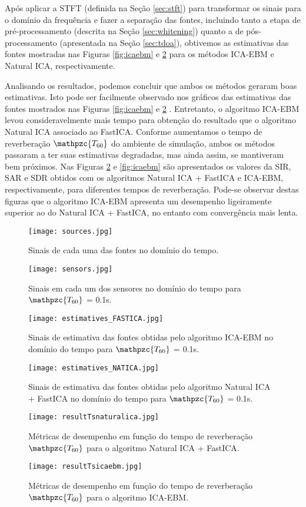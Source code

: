     Após aplicar a STFT (definida na Seção \ref{sec:stft}) para transformar os sinais para o domínio da frequência e fazer a separação das fontes, incluindo tanto a etapa de pré-processamento (descrita na Seção \ref{sec:whitening}) quanto a de pós-processamento (apresentada na Seção \ref{sec:tdoa}), obtivemos as estimativas das fontes mostradas nas Figuras \ref{fig:icaebm} e \ref{fig:natica} para os métodos ICA-EBM e Natural ICA, respectivamente.
    
    Analisando os resultados, podemos concluir que ambos os métodos geraram boas estimativas. Isto pode ser facilmente observado nos gráficos das estimativas das fontes mostrados nas Figuras \ref{fig:icaebm} e \ref{fig:natica} . Entretanto, o algoritmo ICA-EBM levou consideravelmente mais tempo para obtenção do resultado que o algoritmo Natural ICA associado ao FastICA. Conforme aumentamos o tempo de reverberação $\mathpzc{T_{60}}$ do ambiente de simulação, ambos os métodos passaram a ter suas estimativas degradadas, mas ainda assim, se mantiveram bem próximos. Nas Figuras \ref{fig:natica} e \ref{fig:icaebm} são apresentados os valores da SIR, SAR e SDR obtidos com os algoritmos Natural ICA + FastICA e ICA-EBM, respectivamente, para diferentes tempos de reverberação. Pode-se observar destas figuras que o algoritmo ICA-EBM apresenta um desempenho ligeiramente superior ao do Natural ICA + FastICA, no entanto com convergência mais lenta.
    
    \begin{figure}
        \centering
        \texttt{[image: sources.jpg]}
            \caption{Sinais de cada uma das fontes no domínio do tempo.}
        \label{fig:sources}
        \texttt{[image: sensors.jpg]}
            \caption{Sinais em cada um dos sensores no domínio do tempo para $\mathpzc{T_{60}}$ = 0.1s.}
        \label{fig:sensors}
    \end{figure}
    
    \begin{figure}
        \centering
        \texttt{[image: estimatives\_FASTICA.jpg]}
        \caption{Sinais de estimativa das fontes obtidas pelo algoritmo ICA-EBM no domínio do tempo para $\mathpzc{T_{60}}$ = 0.1s.}
        \label{fig:icaebm}
        \texttt{[image: estimatives\_NATICA.jpg]}
        \caption{Sinais de estimativa das fontes obtidas pelo algoritmo Natural ICA + FastICA  no domínio do tempo para $\mathpzc{T_{60}}$ = 0.1s.}
        \label{fig:natica}
    \end{figure}
    
    
    \begin{figure}
        \centering
        \texttt{[image: resultTsnaturalica.jpg]}
        \caption{Métricas de desempenho em função do tempo de reverberação $\mathpzc{T_{60}}$ para o algoritmo Natural ICA + FastICA.}
        \label{fig:T60natica}
         \texttt{[image: resultTsicaebm.jpg]}
        \caption{Métricas de desempenho em função do tempo de reverberação $\mathpzc{T_{60}}$ para o algoritmo ICA-EBM.}
        \label{fig:T60icaebm}
    \end{figure}
    